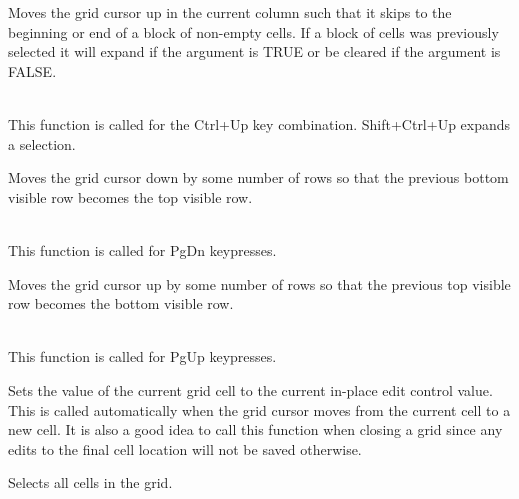 {\label{wxgridmovecursorupblock}


Moves the grid cursor up in the current column such that it skips to the beginning or
end of a block of non-empty cells. If a block of cells was previously selected it
will expand if the argument is TRUE or be cleared if the argument is FALSE.

\\
This function is called for the Ctrl+Up key combination. Shift+Ctrl+Up expands a selection.

\label{wxgridmovepagedown}


Moves the grid cursor down by some number of rows so that the previous bottom visible row
becomes the top visible row.

\\
This function is called for PgDn keypresses.

\label{wxgridmovepageup}


Moves the grid cursor up by some number of rows so that the previous top visible row
becomes the bottom visible row.

\\
This function is called for PgUp keypresses.

\label{wxgridsaveeditcontrolvalue}


Sets the value of the current grid cell to the current in-place edit control value.
This is called automatically when the grid cursor moves from the current cell to a
new cell. It is also a good idea to call this function when closing a grid since
any edits to the final cell location will not be saved otherwise.

\label{wxgridselectall}


Selects all cells in the grid.

\label{wxgridselectblock}


}
